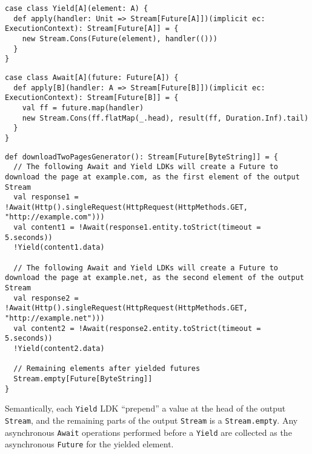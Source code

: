 \begin{lstlisting}[caption={Implementing modified version of \lstinline{Yield} LDK for creating asynchronous generators},label={Yield-StreamFuture}]
case class Yield[A](element: A) {
  def apply(handler: Unit => Stream[Future[A]])(implicit ec: ExecutionContext): Stream[Future[A]] = {
    new Stream.Cons(Future(element), handler(()))
  }
}
\end{lstlisting}

\begin{lstlisting}[caption={Implementing modified version of \lstinline{Await} LDK for creating asynchronous generators},label={Await-StreamFuture}]
case class Await[A](future: Future[A]) {
  def apply[B](handler: A => Stream[Future[B]])(implicit ec: ExecutionContext): Stream[Future[B]] = {
    val ff = future.map(handler)
    new Stream.Cons(ff.flatMap(_.head), result(ff, Duration.Inf).tail)
  }
}
\end{lstlisting}
  

\begin{lstlisting}[caption={Downloading two web pages as an asynchronous generator, in the style of !-notation},label={downloadTwoPages-StreamFuture}]
def downloadTwoPagesGenerator(): Stream[Future[ByteString]] = {
  // The following Await and Yield LDKs will create a Future to download the page at example.com, as the first element of the output Stream
  val response1 = !Await(Http().singleRequest(HttpRequest(HttpMethods.GET, "http://example.com")))
  val content1 = !Await(response1.entity.toStrict(timeout = 5.seconds))
  !Yield(content1.data)

  // The following Await and Yield LDKs will create a Future to download the page at example.net, as the second element of the output Stream
  val response2 = !Await(Http().singleRequest(HttpRequest(HttpMethods.GET, "http://example.net")))
  val content2 = !Await(response2.entity.toStrict(timeout = 5.seconds))
  !Yield(content2.data)

  // Remaining elements after yielded futures
  Stream.empty[Future[ByteString]]
}
\end{lstlisting}

Semantically, each \lstinline{Yield} LDK ``prepend'' a value at the head of the output \lstinline{Stream}, and the remaining parts of the output \lstinline{Stream} is a \lstinline{Stream.empty}. Any asynchronous \lstinline{Await} operations performed before a \lstinline{Yield} are collected as the asynchronous \lstinline{Future} for the yielded element.

